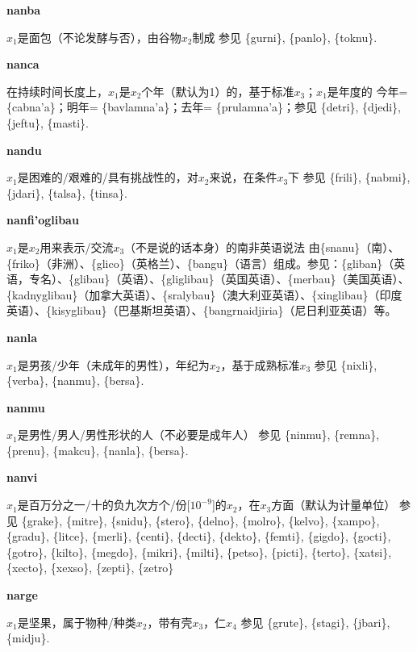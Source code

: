 \documentclass[notitlepage,twocolumn,a4paper,10pt]{book}
\begin{document}
{\sffamily\bfseries nanba}\enspace {\ttfamily\bfseries[nab]}  $x_1$是面包（不论发酵与否），由谷物$x_2$制成 \textemdash{} 参见 \{gurni\}, \{panlo\}, \{toknu\}.

{\sffamily\bfseries nanca}\enspace {\ttfamily\bfseries[        na'a]}  在持续时间长度上，$x_1$是$x_2$个年（默认为1）的，基于标准$x_3$；$x_1$是年度的 \textemdash{} 今年= \{cabna'a\}；明年= \{bavlamna'a\}；去年= \{prulamna'a\}；参见 \{detri\}, \{djedi\}, \{jeftu\}, \{masti\}.

{\sffamily\bfseries nandu}\enspace {\ttfamily\bfseries[nad]}  $x_1$是困难的\slash{}艰难的\slash{}具有挑战性的，对$x_2$来说，在条件$x_3$下 \textemdash{} 参见 \{frili\}, \{nabmi\}, \{jdari\}, \{talsa\}, \{tinsa\}.

{\sffamily\bfseries nanfi'oglibau} $x_1$是$x_2$用来表示\slash{}交流$x_3$（不是说的话本身）的南非英语说法 \textemdash{} 由\{snanu\}（南）、\{friko\}（非洲）、\{glico\}（英格兰）、\{bangu\}（语言）组成。参见：\{gliban\}（英语，专名）、\{glibau\}（英语）、\{gliglibau\}（英国英语）、\{merbau\}（美国英语）、\{kadnyglibau\}（加拿大英语）、\{sralybau\}（澳大利亚英语）、\{xinglibau\}（印度英语）、\{kisyglibau\}（巴基斯坦英语）、\{bangrnaidjiria\}（尼日利亚英语）等。

{\sffamily\bfseries nanla} $x_1$是男孩\slash{}少年（未成年的男性），年纪为$x_2$，基于成熟标准$x_3$ \textemdash{} 参见 \{nixli\}, \{verba\}, \{nanmu\}, \{bersa\}.

{\sffamily\bfseries nanmu}\enspace {\ttfamily\bfseries[        nau]}  $x_1$是男性\slash{}男人\slash{}男性形状的人（不必要是成年人） \textemdash{} 参见 \{ninmu\}, \{remna\}, \{prenu\}, \{makcu\}, \{nanla\}, \{bersa\}.

{\sffamily\bfseries nanvi}\enspace {\ttfamily\bfseries[nav]}  $x_1$是百万分之一\slash{}十的负九次方个\slash{}份[$10^{-9}$]的$x_2$，在$x_3$方面（默认为计量单位） \textemdash{} 参见 \{grake\}, \{mitre\}, \{snidu\}, \{stero\}, \{delno\}, \{molro\}, \{kelvo\}, \{xampo\}, \{gradu\}, \{litce\}, \{merli\}, \{centi\}, \{decti\}, \{dekto\}, \{femti\}, \{gigdo\}, \{gocti\}, \{gotro\}, \{kilto\}, \{megdo\}, \{mikri\}, \{milti\}, \{petso\}, \{picti\}, \{terto\}, \{xatsi\}, \{xecto\}, \{xexso\}, \{zepti\}, \{zetro\}

{\sffamily\bfseries narge}\enspace {\ttfamily\bfseries[nag]}  $x_1$是坚果，属于物种\slash{}种类$x_2$，带有壳$x_3$，仁$x_4$ \textemdash{} 参见 \{grute\}, \{stagi\}, \{jbari\}, \{midju\}.
\end{document}
